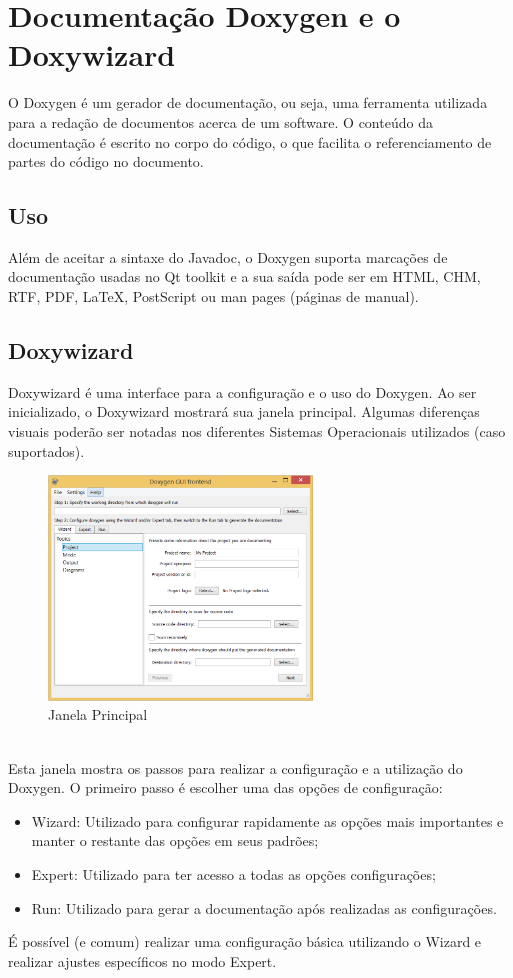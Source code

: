 \section{Documentação Doxygen e o Doxywizard}

O Doxygen é um gerador de documentação, ou seja, uma ferramenta utilizada para a redação de documentos acerca de um software. O conteúdo da documentação é escrito no corpo do código, o que facilita o referenciamento de partes do código no documento.

\subsection{Uso}

Além de aceitar a sintaxe do Javadoc, o Doxygen suporta marcações de documentação usadas no Qt toolkit e a sua saída pode ser em HTML, CHM, RTF, PDF, LaTeX, PostScript ou man pages (páginas de manual).

\subsection{Doxywizard}

Doxywizard é uma interface para a configuração e o uso do Doxygen.
Ao ser inicializado, o Doxywizard mostrará sua janela principal. Algumas diferenças visuais poderão ser notadas nos diferentes Sistemas Operacionais utilizados (caso suportados). 
\begin{figure}[!htb]
\centering
\includegraphics[width=7cm]{./include/chapters/sections/soft/section4/img/janela.png}
\caption{Janela Principal}
\end{figure}\\
Esta janela mostra os passos para realizar a configuração e a utilização do Doxygen. O primeiro passo é escolher uma das opções de configuração:
\begin{itemize}
\item  Wizard: Utilizado para configurar rapidamente as opções mais importantes e manter o restante das opções em seus padrões;
\item  Expert: Utilizado para ter acesso a todas as opções configurações;
\item  Run: Utilizado para gerar a documentação após realizadas as configurações.
\end{itemize}
É possível (e comum) realizar uma configuração básica utilizando o Wizard e realizar ajustes específicos no modo Expert.
